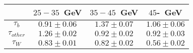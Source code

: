 \begin{table}
\footnotesize
\caption{}
\centering
\begin{tabular}{|c|c|c|c|} \hline
 & $25-35$~GeV & $35-45$~GeV & $45$-~GeV\\\hline
$\tau_{b}$ & $0.91\pm0.06$ & $1.37\pm0.07$ & $1.06\pm0.06$\\\hline
$\tau_{other}$ & $1.26\pm0.02$ & $0.92\pm0.02$ & $0.92\pm0.03$\\\hline
$\tau_{W}$ & $0.83\pm0.01$ & $0.82\pm0.02$ & $0.56\pm0.02$\\\hline
\end{tabular}
\label{tab:scale_factor}
\end{table}
